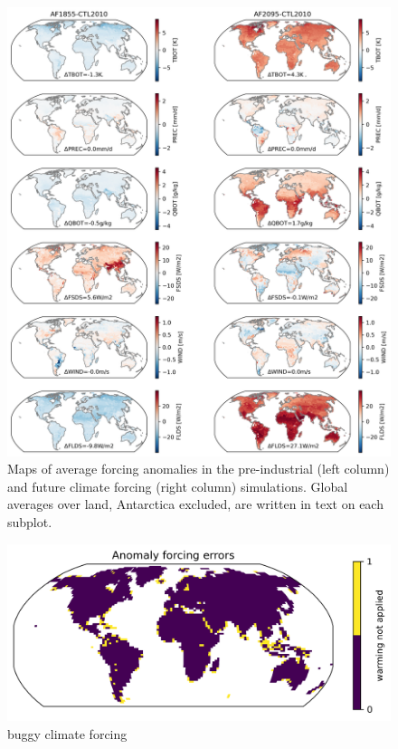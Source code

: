 \documentclass[11pt]{article}
\begin{document}
\begin{figure}[h]
\centering
\includegraphics[width=\textwidth]{figs/supp/anomalies.png}
\caption{Maps of average forcing anomalies in the pre-industrial (left column) and future climate forcing (right column) simulations. Global averages over land, Antarctica excluded, are written in text on each subplot.}
\label{supp:anomalies}
\end{figure}

\begin{figure}[h]
\centering
\includegraphics[width=\textwidth]{figs/supp/anomaly_errors.png}
\caption{buggy climate forcing}
\label{supp:abug}
\end{figure}
\end{document}
